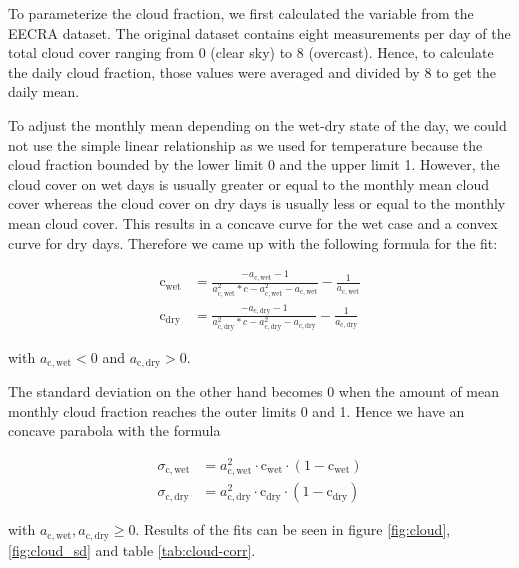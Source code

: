\begin{refsection}
To parameterize the cloud fraction, we first calculated the variable from the EECRA dataset. The original dataset contains eight measurements per day of the total cloud cover ranging from 0 (clear sky) to 8 (overcast). Hence, to calculate the daily cloud fraction, those values were averaged and divided by 8 to get the daily mean.

To adjust the monthly mean depending on the wet-dry state of the day, we could not use the simple linear relationship as we used for temperature because the cloud fraction bounded by the lower limit 0 and the upper limit 1. However, the cloud cover on wet days is usually greater or equal to the monthly mean cloud cover whereas the cloud cover on dry days is usually less or equal to the monthly mean cloud cover. This results in a concave curve for the wet case and a convex curve for dry days. Therefore we came up with the following formula for the fit:

\begin{align}
	\mathrm{c}_\mathrm{wet} &= \frac{-a_{\mathrm{c}, \mathrm{wet}} - 1}{a_{\mathrm{c}, \mathrm{wet}}^2 * c - a_{\mathrm{c}, \mathrm{wet}}^2 - a_{\mathrm{c}, \mathrm{wet}}}  - \frac{1}{a_{\mathrm{c}, \mathrm{wet}}} \nonumber \\
	\mathrm{c}_\mathrm{dry} &= \frac{-a_{\mathrm{c}, \mathrm{dry}} - 1}{a_{\mathrm{c}, \mathrm{dry}}^2 * c - a_{\mathrm{c}, \mathrm{dry}}^2 - a_{\mathrm{c}, \mathrm{dry}}}  - \frac{1}{a_{\mathrm{c}, \mathrm{dry}}}
	\label{eq:cloud_mean}
\end{align}

with $a_{\mathrm{c}, \mathrm{wet}} < 0$ and $a_{\mathrm{c}, \mathrm{dry}} > 0$.

The standard deviation on the other hand becomes 0 when the amount of mean monthly cloud fraction reaches the outer limits 0 and 1. Hence we have an concave parabola with the formula

\begin{align}
	\sigma_{\mathrm{c}, \mathrm{wet}} &= a_{\mathrm{c}, \mathrm{wet}}^2 \cdot \mathrm{c}_\mathrm{wet} \cdot (1 - \mathrm{c}_\mathrm{wet}) \nonumber \\
	\sigma_{\mathrm{c}, \mathrm{dry}} &= a_{\mathrm{c}, \mathrm{dry}}^2 \cdot \mathrm{c}_\mathrm{dry} \cdot (1 - \mathrm{c}_\mathrm{dry}) \label{eq:cloud_sd}
\end{align}

with $a_{\mathrm{c}, \mathrm{wet}}, a_{\mathrm{c}, \mathrm{dry}} \geq 0$. Results of the fits can be seen in figure \ref{fig:cloud}, \ref{fig:cloud_sd} and table \ref{tab:cloud-corr}.



\end{refsection}
